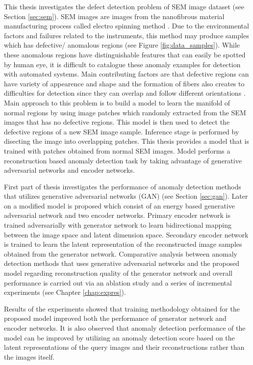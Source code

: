 This thesis investigates the defect detection problem \cite{carrera2016defect} of 
SEM image dataset \cite{sem} (see Section \ref{sec:sem}). SEM images are images from the nanofibrous material manufacturing process called electro spinning method \cite{carrera2016defect}.
 Due to the environmental factors and failures related to the instruments, this method may produce 
samples which has defective/ anomalous regions (see Figure \ref{fig:data_samples}). 
While these anomalous regions have  
distinguishable features that can easily be spotted by human eye, it is difficult to 
catalogue these anomaly examples 
for detection with automated systems. Main contributing factors are that defective regions can have 
variety of appearence and shape and the formation of fibers also creates to difficulties for detection
since they can overlap and follow different orientations \cite{carrera2016defect}. Main approach to 
this problem is to build a model to learn the manifold of normal regions by using image patches 
which randomly extracted from the SEM images that has no defective regions. This model is then used 
to detect the defective regions of a new SEM image sample. Inference stage is performed by 
disecting the image into overlapping patches. This thesis provides a model that is trained with 
patches obtained from normal SEM images. Model performs a reconstruction based anomaly detection task 
by taking advantage of generative adversarial networks and encoder networks.

First part of thesis investigates the performance of anomaly detection methods that utilizes
generative adversarial networks (GAN) (see Section \ref{sec:gan}). Later on a modified model is proposed 
which consist of an energy based generative adversarial network and two encoder networks. 
Primary encoder network is trained adversarially with generator network to learn bidirectional 
mapping between the image space and latent dimension space. Secondary encoder network 
is trained to learn the latent representation of the reconstructed image samples obtained from 
the generator network. Comparative analysis between anomaly detection methods that uses 
generative adversarial networks and the proposed model regarding reconstruction quality 
of the generator network and overall performance is carried 
out via an ablation study and a series of incremental experiments (see Chapter \ref{chap:expres}).

Results of the experiments showed that training methodology obtained for the proposed model 
improved both the performance of generator network and encoder networks. It is also observed 
that anomaly detection performance of the model can be improved by utilizing an anomaly detection 
score based on the latent representations of the query images and their reconstructions rather 
than the images itself.

